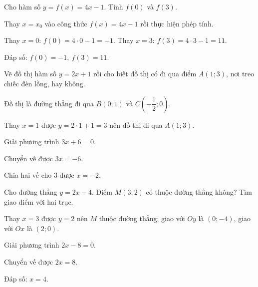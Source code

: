 
\begin{problem}[8DS-NEW-001]
Cho hàm số $y = f(x) = 4x - 1$. Tính $f(0)$ và $f(3)$.

\begin{solution}
Thay $x = x_0$ vào công thức $f(x) = 4x - 1$ rồi thực hiện phép tính.

Thay $x = 0$: $f(0) = 4 \cdot 0 - 1 = -1$. Thay $x = 3$: $f(3) = 4 \cdot 3 - 1 = 11$.

Đáp số: $f(0) = -1,\ f(3) = 11$.
\end{solution}
\end{problem}

\begin{problem}[8DS-NEW-002]
Vẽ đồ thị hàm số $y = 2x + 1$ rồi cho biết đồ thị có đi qua điểm $A(1; 3)$, nơi treo chiếc đèn lồng, hay không.

\begin{solution}
Đồ thị là đường thẳng đi qua $B(0; 1)$ và $C(-\dfrac{1}{2}; 0)$.

Thay $x = 1$ được $y = 2 \cdot 1 + 1 = 3$ nên đồ thị đi qua $A(1; 3)$.
\end{solution}
\end{problem}

\begin{problem}[8DS-NEW-003]
Giải phương trình $3x + 6 = 0$.

\begin{solution}
Chuyển vế được $3x = -6$.

Chia hai vế cho $3$ được $x = -2$.
\end{solution}
\end{problem}

\begin{problem}[8DS-NEW-004]
Cho đường thẳng $y = 2x - 4$. Điểm $M(3; 2)$ có thuộc đường thẳng không? Tìm giao điểm với hai trục.

\begin{solution}
Thay $x = 3$ được $y = 2$ nên $M$ thuộc đường thẳng; giao với $Oy$ là $(0; -4)$, giao với $Ox$ là $(2; 0)$.
\end{solution}
\end{problem}

\begin{problem}[8DS-PT1-001]
Giải phương trình $2x - 8 = 0$.

\begin{solution}
Chuyển vế được $2x = 8$.

Đáp số: $x = 4$.
\end{solution}
\end{problem}

